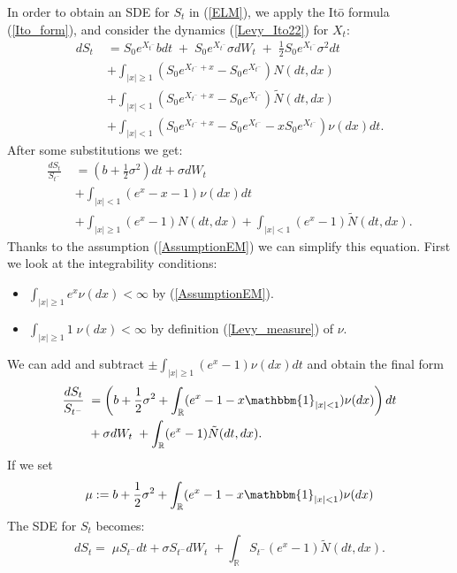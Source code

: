 \documentclass[a4paper,10pt]{article}
\newcommand{\numberset}{\mathbb}
\newcommand{\R}{\numberset{R}}
\begin{document}
In order to obtain an SDE for $S_t$ in (\ref{ELM}), we apply the It\={o} formula (\ref{Ito_form}), and consider 
the dynamics (\ref{Levy_Ito22}) for $X_t$:
\begin{align*}
 d S_t \; &= S_0 e^{X_{t^-}} b dt \; + \; S_0 e^{X_{t^-}} \sigma dW_t \; + \; \frac{1}{2}S_0 e^{X_{t^-}}\sigma^2 dt \\ \nonumber
          &+ \int_{|x|\geq 1} (S_0 e^{X_{t^-}+x} - S_0 e^{X_{t^-}}) N(dt,dx) \\ \nonumber
          &+ \int_{|x|< 1} (S_0 e^{X_{t^-}+x} - S_0 e^{X_{t^-}}) \tilde N(dt,dx) \\  \nonumber
          &+ \int_{|x|< 1} (S_0 e^{X_{t^-}+x} - S_0 e^{X_{t^-}} - x S_0 e^{X_{t^-}}) \nu(dx) dt. \nonumber
\end{align*}
After some substitutions we get:
\begin{align}
 \frac{d S_t}{S_{t^-}}  \; &= (b + \frac{1}{2}\sigma^2 ) dt + \sigma dW_t \\ \nonumber
                          &+ \int_{|x|< 1} ( e^{x} - x - 1) \nu(dx) dt \\ \nonumber
                          &+ \int_{|x|\geq 1} (e^{x} - 1) N(dt,dx) + \int_{|x|< 1} (e^{x} - 1) \tilde N(dt,dx). \nonumber
\end{align}
Thanks to the assumption (\ref{AssumptionEM}) we can simplify this equation.
First we look at the integrability conditions:
\begin{itemize}
 \item $\int_{|x|\geq 1}  e^{x} \nu(dx) < \infty$ by (\ref{AssumptionEM}).  
 \item $\int_{|x|\geq 1} 1\; \nu(dx) < \infty$ by definition (\ref{Levy_measure}) of $\nu$.
\end{itemize}
We can add and subtract $\pm \int_{|x|\geq 1} ( e^{x} - 1) \nu(dx) dt $ and obtain the final form
\begin{align} \label{exp_sde}
 \frac{d S_t}{S_{t^-}}  \; &= \left(b + \frac{1}{2}\sigma^2 + \int_{\R} ( e^{x} - 1 -x\mathbbm{1}_{|x|<1}) \nu(dx) \right) dt  \\ \nonumber
                          &+  \sigma dW_t \; + \int_{\R} (e^{x} - 1) \tilde N(dt,dx). \nonumber
\end{align}
If we set
\begin{equation}\label{mu}
 \mu := b + \frac{1}{2}\sigma^2 + \int_{\R} ( e^{x} - 1 -x\mathbbm{1}_{|x|<1}) \nu(dx)
\end{equation}
The SDE for $S_t$ becomes: 
\begin{equation}\label{exp_sde2}
 d S_t = \; \mu S_{t^-} dt +  \sigma S_{t^-} dW_t \; + \int_{\R} S_{t^-} (e^{x} - 1) \tilde N(dt,dx). 
\end{equation}
\end{document}
